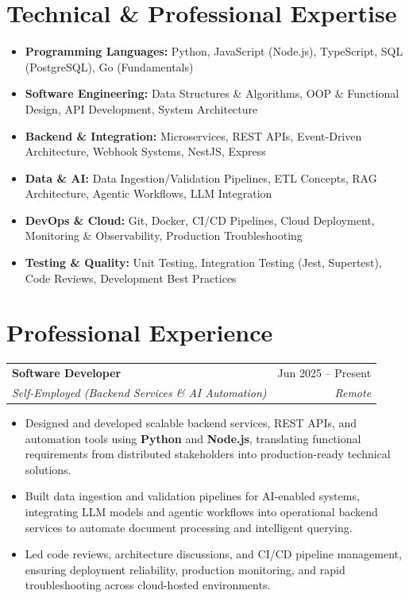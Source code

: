\documentclass[a4paper,10pt]{article}
\makeatletter
\newcommand{\resumeItem}[1]{\item\small{#1}}
\newcommand{\resumeSubheading}[4]{
  \vspace{2pt}\noindent
  \begin{tabular*}{\textwidth}{@{}l@{\extracolsep{\fill}}r@{}}
    \textbf{#1} & #2 \\
    \textit{\small #3} & \textit{\small #4} \\
  \end{tabular*}\vspace{-4pt}
}
\makeatother
\begin{document}
\section{Technical \& Professional Expertise}
\begin{itemize}[leftmargin=0.15in, label={}, topsep=1pt, itemsep=1pt]
\item \small{\textbf{Programming Languages:} Python, JavaScript (Node.js), TypeScript, SQL (PostgreSQL), Go (Fundamentals)}
\item \small{\textbf{Software Engineering:} Data Structures \& Algorithms, OOP \& Functional Design, API Development, System Architecture}
\item \small{\textbf{Backend \& Integration:} Microservices, REST APIs, Event-Driven Architecture, Webhook Systems, NestJS, Express}
\item \small{\textbf{Data \& AI:} Data Ingestion/Validation Pipelines, ETL Concepts, RAG Architecture, Agentic Workflows, LLM Integration}
\item \small{\textbf{DevOps \& Cloud:} Git, Docker, CI/CD Pipelines, Cloud Deployment, Monitoring \& Observability, Production Troubleshooting}
\item \small{\textbf{Testing \& Quality:} Unit Testing, Integration Testing (Jest, Supertest), Code Reviews, Development Best Practices}
\end{itemize}

\vspace{1pt}

\section{Professional Experience}

\resumeSubheading
{Software Developer}{Jun 2025 -- Present}
{Self-Employed (Backend Services \& AI Automation)}{Remote}

\begin{itemize}[leftmargin=0.15in, topsep=1pt, itemsep=1pt]
\resumeItem{Designed and developed scalable backend services, REST APIs, and automation tools using \textbf{Python} and \textbf{Node.js}, translating functional requirements from distributed stakeholders into production-ready technical solutions.}
\resumeItem{Built data ingestion and validation pipelines for AI-enabled systems, integrating LLM models and agentic workflows into operational backend services to automate document processing and intelligent querying.}
\resumeItem{Led code reviews, architecture discussions, and CI/CD pipeline management, ensuring deployment reliability, production monitoring, and rapid troubleshooting across cloud-hosted environments.}
\end{itemize}
\end{document}
